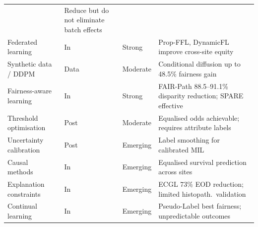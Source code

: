 \begin{table}[!ht]
\begin{tabularx}{\linewidth}{@{}l l l X@{}}
      & Reduce but do not eliminate batch effects \\
    Federated learning~\citep{hosseini2023proportionally, zhang2025dynamicfl}      & In   & Strong
      & Prop-FFL, DynamicFL improve cross-site equity \\
    Synthetic data / DDPM~\citep{ktena2024generative, vanbooven2025mitigating}   & Data & Moderate
      & Conditional diffusion up to 48.5\% fairness gain \\
    Fairness-aware learning~\citep{lin2025contrastive, xu2026spare, huang2025knowledge} & In   & Strong
      & FAIR-Path 88.5--91.1\% disparity reduction; SPARE effective \\
    Threshold optimisation~\citep{soltan2024challenges, sufian2024mitigating}  & Post & Moderate
      & Equalised odds achievable; requires attribute labels \\
    Uncertainty calibration~\citep{park2025uncertainty, bhattacharyya2025conformal} & Post & Emerging
      & Label smoothing for calibrated MIL \\
    Causal methods~\citep{correamedero2024causal}          & In   & Emerging
      & Equalised survival prediction across sites \\
    Explanation constraints~\citep{shabazian2025joint, hagele2020resolving}  & In   & Emerging
      & ECGL 73\% EOD reduction; limited histopath.\ validation \\
    Continual learning~\citep{cecconi2024fairness}      & In   & Emerging
      & Pseudo-Label best fairness; unpredictable outcomes \\
    \bottomrule
  \end{tabularx}
\end{table}

